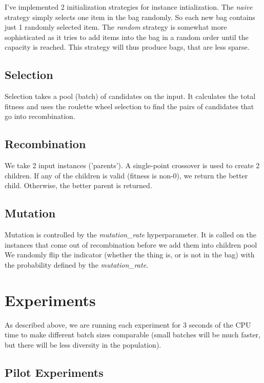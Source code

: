 \documentclass[a4paper,10pt]{article}
\begin{document}
I've implemented 2 initialization strategies for instance intialization. The \emph{naive} strategy simply selects one item in the bag randomly. So each new bag contains just 1 randomly selected item. The \emph{random} strategy is somewhat more sophisticated as it tries to add items into the bag in a random order until the capacity is reached. This strategy will thus produce bags, that are less sparse.

\subsection{Selection}

Selection takes a pool (batch) of candidates on the input. It calculates the total fitness and uses the roulette wheel selection to find the pairs of candidates that go into recombination.

\subsection{Recombination}

We take 2 input instances ('parents'). A single-point crossover is used to create 2 children. If any of the children is valid (fitness is non-0), we return the better child. Otherwise, the better parent is returned.

\subsection{Mutation}

Mutation is controlled by the \emph{mutation\_rate} hyperparameter. It is called on the instances that come out of recombination before we add them into children pool We randomly flip the indicator (whether the thing is, or is not in the bag) with the probability defined by the \emph{mutation\_rate}.


\section{Experiments}

As described above, we are running each experiment for 3 seconds of the CPU time to make different batch sizes comparable (small batches will be much faster, but there will be less diversity in the population).

\subsection{Pilot Experiments}
\end{document}
